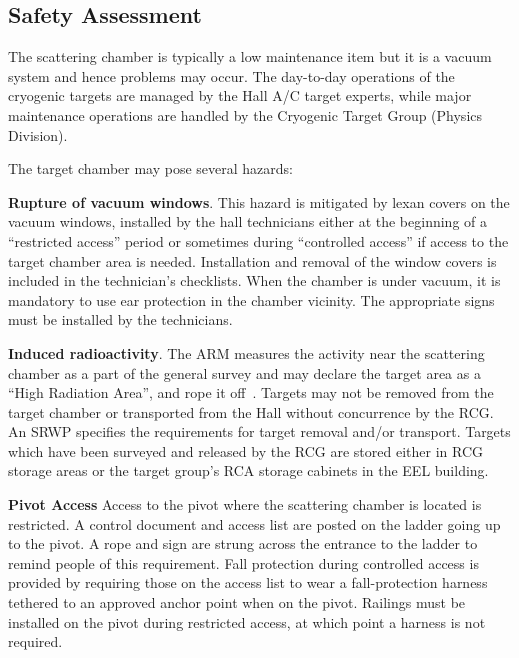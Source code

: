 \begin{safetyen}{0}{0}
\subsection{Safety Assessment}


The scattering chamber is typically a low maintenance item but it is a vacuum system and hence problems may occur. The day-to-day operations of the cryogenic targets are managed by the Hall A/C target experts, while major maintenance operations are handled by the Cryogenic Target Group (Physics Division). 

The target chamber may pose several hazards:

\begin{list}{.~}{\setlength{\itemsep}{-0.15cm}}
  \item {\bf Rupture of vacuum windows}. This hazard is mitigated by
        lexan covers on the vacuum windows, installed by the hall technicians
        either at the beginning of a ``restricted access'' period 
        or sometimes during ``controlled access'' if access to the target chamber area is needed.
        Installation and removal of the window covers is included in the technician's checklists.
        When the chamber is under vacuum, it is mandatory to use ear protection in the chamber
        vicinity. The appropriate signs must be installed by the technicians. 

  \item {\bf Induced radioactivity}. The ARM  measures the activity near the scattering chamber as a part of the general survey and may declare the target area 
        as a ``High Radiation Area'', and rope it off~\cite{RWIcebaf}. 
        Targets may not be removed from the target chamber or transported from the Hall without 
        concurrence by the RCG. An SRWP specifies the requirements for target removal and/or 
        transport. Targets which have been surveyed and released by the RCG are stored either in RCG storage areas or the target group's RCA storage cabinets in the EEL building.
        
\item {\bf Pivot Access} Access to the pivot where the scattering chamber is located is restricted. A control document and access list are posted on the ladder going up to the pivot. A rope and sign are strung across the entrance to the ladder to remind people of this requirement. Fall protection during controlled access is provided by requiring those on the access list to wear a fall-protection harness tethered to an approved anchor point when on the pivot. Railings must be installed on the pivot during restricted access, at which point a harness is not required.


\end{list}
\end{safetyen}
